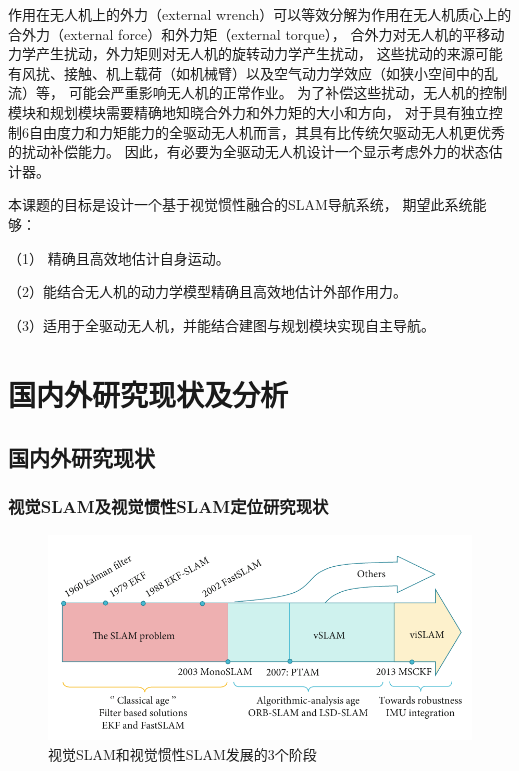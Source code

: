 作用在无人机上的外力（external wrench）可以等效分解为作用在无人机质心上的合外力（external force）和外力矩（external torque），
合外力对无人机的平移动力学产生扰动，外力矩则对无人机的旋转动力学产生扰动，
这些扰动的来源可能有风扰、接触、机上载荷（如机械臂）以及空气动力学效应（如狭小空间中的乱流）等，
可能会严重影响无人机的正常作业。
为了补偿这些扰动，无人机的控制模块和规划模块需要精确地知晓合外力和外力矩的大小和方向\cite{ding2021vid}，
对于具有独立控制6自由度力和力矩能力的全驱动无人机而言，其具有比传统欠驱动无人机更优秀的扰动补偿能力。
因此，有必要为全驱动无人机设计一个显示考虑外力的状态估计器。

本课题的目标是设计一个基于视觉惯性融合的SLAM导航系统，
期望此系统能够：

（1） 精确且高效地估计自身运动。

（2）能结合无人机的动力学模型精确且高效地估计外部作用力。
 
（3）适用于全驱动无人机，并能结合建图与规划模块实现自主导航。


\section{国内外研究现状及分析}

\subsection{国内外研究现状}
\subsubsection{视觉SLAM及视觉惯性SLAM定位研究现状}\label{subsubsec:status_of_vslam_and_vislam}

\begin{figure}[htbp]
    \centering
    \includegraphics[width = \textwidth]{figures/vslam_history.png}
    \caption{视觉SLAM和视觉惯性SLAM发展的3个阶段\cite{servieres2021visual}}
    \label{fig:vslam_history}
\end{figure}

